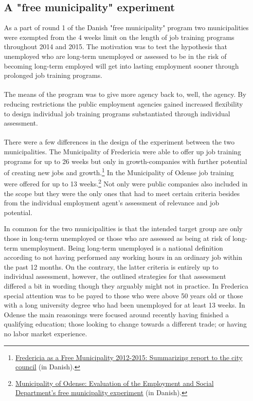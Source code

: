 \label{sec:background}
\subsection{A "free municipality" experiment}
\label{subsec:experiements}
As a part of round 1 of the Danish "free municipality" program two municipalities were exempted from the 4 weeks limit on the length of job training programs throughout 2014 and 2015. The motivation was to test the hypothesis that unemployed who are long-term unemployed or assessed to be in the risk of becoming long-term employed will get into lasting employment sooner through prolonged job training programs.
\\
\\
The means of the program was to give more agency back to, well, the agency. By reducing restrictions the public employment agencies gained increased flexibility to design individual job training programs substantiated through individual assessment.
\\
\\
There were a few differences in the design of the experiment between the two municipalities. The Municipality of Fredericia were able to offer up job training programs for up to 26 weeks but only in growth-companies with further potential of creating new jobs and growth.\footnote{\href{https://www.fredericia.dk/sites/default/files/16-676-27_fk_som_frikommune_2012-2015._rapport.pdf}{Fredericia as a Free Municipality 2012-2015: Summarizing report to the city council} (in Danish).} In the Municipality of Odense job training were offered for up to 13 weeks.\footnote{\href{https://www.odense.dk/politik/politikker-og-visioner/odense-som-frikommune}{Municipality of Odense: Evaluation of the Employment and Social Department's free municipality experiment} (in Danish).} Not only were public companies also included in the scope but they were the only ones that had to meet certain criteria besides from the individual employment agent's assessment of relevance and job potential.

In common for the two municipalities is that the intended target group are only those in long-term unemployed or those who are assessed as being at risk of long-term unemployment. Being long-term unemployed is a national definition according to not having performed any working hours in an ordinary job within the past 12 months. On the contrary, the latter criteria is entirely up to individual assessment, however, the outlined strategies for that assessment differed a bit in wording though they arguably might not in practice. In Frederica special attention was to be payed to those who were above 50 years old or those with a long university degree who had been unemployed for at least 13 weeks. In Odense the main reasonings were focused around recently having finished a qualifying education; those looking to change towards a different trade; or having no labor market experience.


